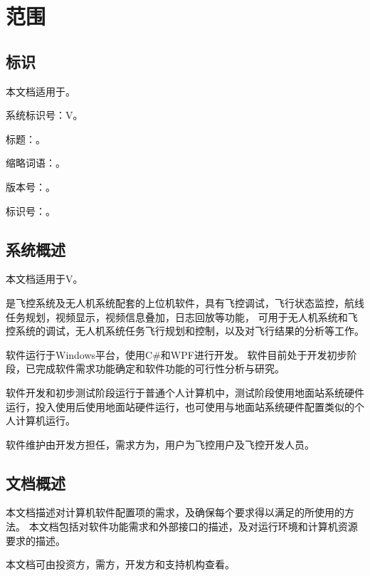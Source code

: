 
\section{范围}
\subsection{标识}
本文档适用于\csciname。

系统标识号：\csciname V\csciver。

标题：\csciname。

缩略词语：\csciabbr。

版本号：\csciver。

标识号：\csciver。

\subsection{系统概述}
本文档适用于\csciname V\csciver。

\csciname 是\cscidem 飞控系统及无人机系统配套的上位机软件，具有飞控调试，飞行状态监控，航线任务规划，视频显示，视频信息叠加，日志回放等功能，
可用于无人机系统和飞控系统的调试，无人机系统任务飞行规划和控制，以及对飞行结果的分析等工作。

软件运行于Windows平台，使用C\#和WPF进行开发。
软件目前处于开发初步阶段，已完成软件需求功能确定和软件功能的可行性分析与研究。

软件开发和初步测试阶段运行于普通个人计算机中，测试阶段使用地面站系统硬件运行，投入使用后使用地面站硬件运行，也可使用与地面站系统硬件配置类似的个人计算机运行。

软件维护由开发方担任，需求方为\cscidem，用户为\cscidem 飞控用户及飞控开发人员。


\subsection{文档概述}
本文档描述对计算机软件配置项的需求，及确保每个要求得以满足的所使用的方法。
本文档包括对软件功能需求和外部接口的描述，及对运行环境和计算机资源要求的描述。

本文档可由投资方，需方，开发方和支持机构查看。

\clearpage
\endinput
